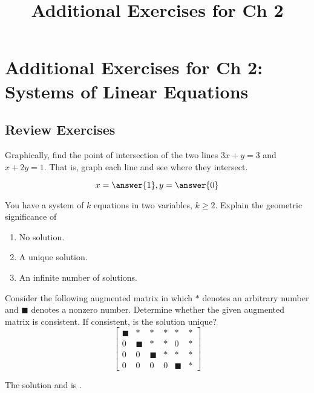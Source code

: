 \documentclass{ximera}
\title{Additional Exercises for Ch 2} \license{CC BY-NC-SA 4.0}
\begin{document}
\begin{abstract}
\end{abstract}
\maketitle

\section*{Additional Exercises for Ch 2: Systems of Linear Equations}

\subsection*{Review Exercises}

\begin{problem}\label{prb:2.2}
Graphically, find the point of intersection of the two lines $
3x+y=3$ and $x+2y=1.$ That is, graph each line
and see where they intersect.

 $$x=\answer{1},y=\answer{0}$$
\end{problem}

\begin{problem}\label{prb:2.3} You have a system of $k$ equations in two variables, $k\geq 2$.
Explain the geometric significance of

\begin{enumerate}
\item No solution.
\item A unique solution.
\item An infinite number of solutions.
\end{enumerate}
\end{problem}

\begin{problem}\label{prb:2.4}
Consider the following augmented matrix in which $\ast $ denotes an
arbitrary number and $\blacksquare $ denotes a nonzero number. Determine
whether the given augmented matrix is consistent. If consistent, is the
solution unique?
\begin{equation*}
\left[
\begin{array}{ccccc|c}
\blacksquare & \ast & \ast & \ast & \ast & \ast \\
0 & \blacksquare & \ast & \ast & 0 & \ast \\
0 & 0 & \blacksquare & \ast & \ast & \ast \\
0 & 0 & 0 & 0 & \blacksquare & \ast
\end{array}
\right] 
\end{equation*}

The solution  and is .
\end{problem}
\end{document}
